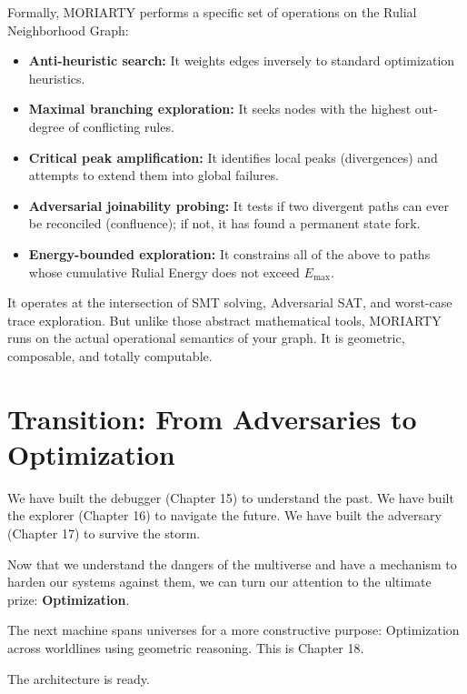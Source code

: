 \begin{tcolorbox}[title=\textbf{MORIARTY = Budgeted Adversarial Traversal}]
Formally, MORIARTY performs a specific set of operations on the Rulial Neighborhood Graph:
\begin{itemize}
    \item \textbf{Anti-heuristic search:} It weights edges inversely to standard optimization heuristics.
    \item \textbf{Maximal branching exploration:} It seeks nodes with the highest out-degree of conflicting rules.
    \item \textbf{Critical peak amplification:} It identifies local peaks (divergences) and attempts to extend them into global failures.
    \item \textbf{Adversarial joinability probing:} It tests if two divergent paths can ever be reconciled (confluence); if not, it has found a permanent state fork.
    \item \textbf{Energy-bounded exploration:} It constrains all of the above to paths whose cumulative Rulial Energy does not exceed $E_{\max}$.
\end{itemize}
It operates at the intersection of SMT solving, Adversarial SAT, and worst-case trace exploration. But unlike those abstract mathematical tools, MORIARTY runs on the actual operational semantics of your graph. It is geometric, composable, and totally computable.
\end{tcolorbox}

\section{Transition: From Adversaries to Optimization}

We have built the debugger (Chapter 15) to understand the past. We have built the explorer (Chapter 16) to navigate the future. We have built the adversary (Chapter 17) to survive the storm.

Now that we understand the dangers of the multiverse and have a mechanism to harden our systems against them, we can turn our attention to the ultimate prize: \textbf{Optimization}.

The next machine spans universes for a more constructive purpose: Optimization across worldlines using geometric reasoning. This is Chapter 18.

The architecture is ready.
